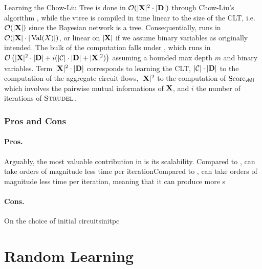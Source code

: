 Learning the Chow-Liu Tree is done in $\mathcal{O}(|\mathbf{X}|^2\cdot|\mathbf{D}|)$ through Chow-Liu's
algorithm \citep{chow68}, while the vtree is compiled in time linear to the size of the CLT, i.e.\
$\mathcal{O}(|\mathbf{X}|)$ since the Bayesian network is a tree. Consequentially, 
runs in $\mathcal{O}(|\mathbf{X}|\cdot|\operatorname*{\normalfont{Val}}(X)|)$, or linear on $|\mathbf{X}|$ if we assume binary variables as
originally intended. The bulk of the computation falls under \textproc{Strudel}, which runs in
$\mathcal{O}\left(|\mathbf{X}|^2\cdot|\mathbf{D}|+i(|\mathcal{C}|\cdot|\mathbf{D}|+|\mathbf{X}|^2)\right)$ assuming a
bounded max depth $m$ and binary variables. Term $|\mathbf{X}|^2\cdot|\mathbf{D}|$ corresponds to learning
the CLT, $|\mathcal{C}|\cdot|\mathbf{D}|$ to the computation of the aggregate circuit flows,
$|\mathbf{X}|^2$ to the computation of $\operatorname{\normalfont{Score}}_{\textsf{vMI}}$ which involves the pairwise mutual
informations of $\mathbf{X}$, and $i$ the number of iterations of $\textproc{Strudel}$.

\subsubsection{Pros and Cons}

\paragraph{Pros.} Arguably, the most valuable contribution in  is its
scalability. Compared to ,  can take orders of magnitude less
time per iterationCompared to \textproc{LearnPSDD}, \textproc{Strudel} can take orders of magnitude
less time per iteration, meaning that it can produce more \textproc{Split}s 

\paragraph{Cons.}

\begin{remark}[breakable]{On the choice of initial circuits}{initpc}
  \citep{choi13,oztok15,choi17,shen17}
\end{remark}

\section{Random Learning}
\label{sec:random}
